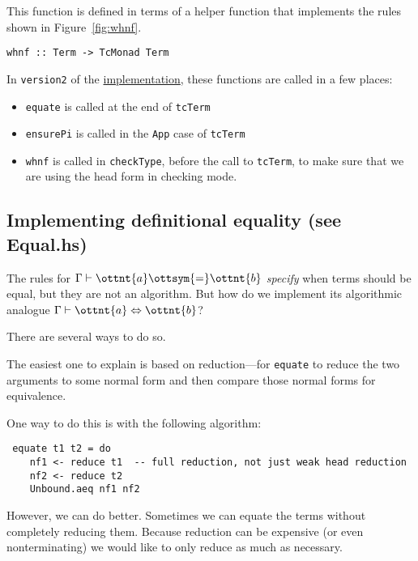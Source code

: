 \documentclass{article}
\theoremstyle{definition}
\begin{document}
This function is defined in terms of a helper function that implements the
rules shown in Figure~\ref{fig:whnf}.
\begin{verbatim}
whnf :: Term -> TcMonad Term
\end{verbatim}

\noindent
In \texttt{version2} of the \href{version2/src/TypeCheck.hs}{implementation},
these functions are called in a few places:
\begin{itemize}
\item \texttt{equate} is called at the
end of \texttt{tcTerm}
\item \texttt{ensurePi} is called in the \texttt{App} case
of \texttt{tcTerm}
\item \texttt{whnf} is called in \texttt{checkType}, before the call to
  \texttt{tcTerm}, to make sure that we are using the head form in checking
  mode.
\end{itemize}

\subsection{Implementing definitional equality (see Equal.hs)}
\label{sec:equate}

The rules for $\Gamma  \vdash  \ottnt{a}  \ottsym{=}  \ottnt{b}$ \emph{specify} when terms should be equal, but
they are not an algorithm. But how do we implement its algorithmic analogue
$\Gamma  \vdash  \ottnt{a}  \Leftrightarrow  \ottnt{b}$?


There are several ways to do so.

The easiest one to explain is based on reduction---for \texttt{equate} to
reduce the two arguments to some normal form and then compare those normal
forms for equivalence.

One way to do this is with the following algorithm:

\begin{verbatim}
 equate t1 t2 = do
    nf1 <- reduce t1  -- full reduction, not just weak head reduction
    nf2 <- reduce t2
    Unbound.aeq nf1 nf2
\end{verbatim}

However, we can do better.  Sometimes we can equate the terms without
completely reducing them. Because reduction can be expensive (or even
nonterminating) we would like to only reduce as much as necessary.
\end{document}
